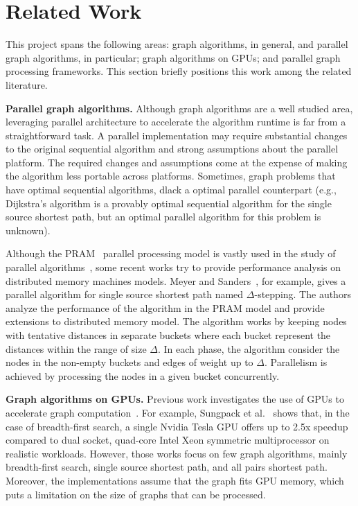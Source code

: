 \section{Related Work}
\label{sec:related}

This project spans the following areas: graph algorithms, in general, and parallel graph algorithms, in particular; graph algorithms on GPUs; and parallel graph processing frameworks. This section briefly positions this work among the related literature.

{\bf Parallel graph algorithms.} Although graph algorithms are a well studied area, leveraging parallel architecture to accelerate the algorithm runtime is far from a straightforward task. A parallel implementation may require substantial changes to the original sequential algorithm and strong assumptions about the parallel platform. The required changes and assumptions come at the expense of making the algorithm less portable across platforms. Sometimes, graph problems that have optimal sequential algorithms, dlack a optimal parallel counterpart (e.g., Dijkstra's algorithm is a provably optimal sequential algorithm for the single source shortest path, but an optimal parallel algorithm for this problem is unknown).  

Although the PRAM~\cite{Fortune78} parallel processing model is vastly used in the study of parallel algorithms~\cite{Quinn1984,Atallah1984}, some recent works try to provide performance analysis on distributed memory machines models. Meyer and Sanders~\cite{Meyer2003}, for example, gives a parallel algorithm for single source shortest path named $\Delta$-stepping. The authors analyze the performance of the algorithm in the PRAM model and provide extensions to distributed memory model. The algorithm works by keeping nodes with tentative distances in separate buckets where each bucket represent the distances within the range of size $\Delta$. In each phase, the algorithm consider the nodes in the non-empty buckets and edges of weight up to $\Delta$. Parallelism is achieved by processing the nodes in a given bucket concurrently. 

{\bf Graph algorithms on GPUs.} Previous work investigates the use of GPUs to accelerate graph computation~\cite{Harish2007, Katz2008, Sungpack2010, dehne2010exploring}. For example, Sungpack et al.~\cite{Sungpack2010} shows that, in the case of breadth-first search, a single Nvidia Tesla GPU offers up to 2.5x speedup compared to dual socket, quad-core Intel Xeon symmetric multiprocessor on realistic workloads. However, those works focus on few graph algorithms, mainly breadth-first search, single source shortest path, and all pairs shortest path. Moreover, the implementations assume that the graph fits GPU memory, which puts a limitation on the size of graphs that can be processed. 

